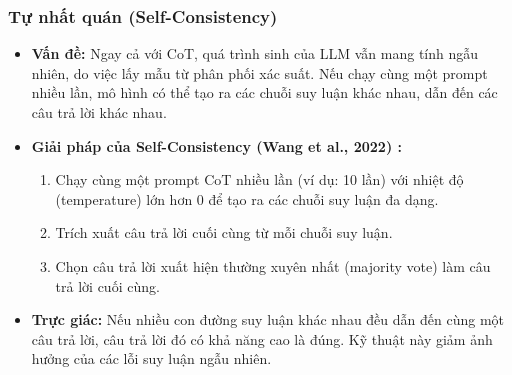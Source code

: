 \subsubsection{Tự nhất quán (Self-Consistency)}
\begin{itemize}
    \item \textbf{Vấn đề:} Ngay cả với CoT, quá trình sinh của LLM vẫn mang tính ngẫu nhiên, do việc lấy mẫu từ phân phối xác suất. Nếu chạy cùng một prompt nhiều lần, mô hình có thể tạo ra các chuỗi suy luận khác nhau, dẫn đến các câu trả lời khác nhau.
    \item \textbf{Giải pháp của Self-Consistency (Wang et al., 2022) \cite{wang2022self}:}
        \begin{enumerate}
            \item Chạy cùng một prompt CoT nhiều lần (ví dụ: 10 lần) với nhiệt độ (temperature) lớn hơn 0 để tạo ra các chuỗi suy luận đa dạng.
            \item Trích xuất câu trả lời cuối cùng từ mỗi chuỗi suy luận.
            \item Chọn câu trả lời xuất hiện thường xuyên nhất (majority vote) làm câu trả lời cuối cùng.
        \end{enumerate}
    \item \textbf{Trực giác:} Nếu nhiều con đường suy luận khác nhau đều dẫn đến cùng một câu trả lời, câu trả lời đó có khả năng cao là đúng. Kỹ thuật này giảm ảnh hưởng của các lỗi suy luận ngẫu nhiên.
\end{itemize}

